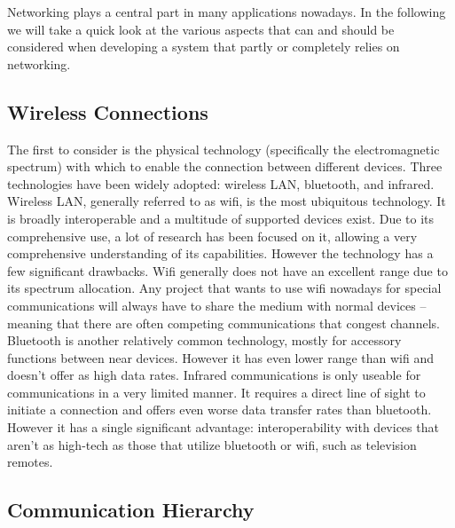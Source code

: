 Networking plays a central part in many applications nowadays.
In the following we will take a quick look at the various aspects that can and should be considered when developing a system that partly or completely relies on networking.

\subsection{Wireless Connections}

The first to consider is the physical technology (specifically the electromagnetic spectrum) with which to enable the connection between different devices.
Three technologies have been widely adopted: wireless LAN, bluetooth, and infrared.
Wireless LAN, generally referred to as wifi, is the most ubiquitous technology.
It is broadly interoperable and a multitude of supported devices exist.
Due to its comprehensive use, a lot of research has been focused on it, allowing a very comprehensive understanding of its capabilities.
However the technology has a few significant drawbacks.
Wifi generally does not have an excellent range due to its spectrum allocation.
Any project that wants to use wifi nowadays for special communications will always have to share the medium with normal devices – meaning that there are often competing communications that congest channels.
Bluetooth is another relatively common technology, mostly for accessory functions between near devices.
However it has even lower range than wifi and doesn’t offer as high data rates.
Infrared communications is only useable for communications in a very limited manner.
It requires a direct line of sight to initiate a connection and offers even worse data transfer rates than bluetooth.
However it has a single significant advantage: interoperability with devices that aren’t as high-tech as those that utilize bluetooth or wifi, such as television remotes.

\subsection{Communication Hierarchy}

